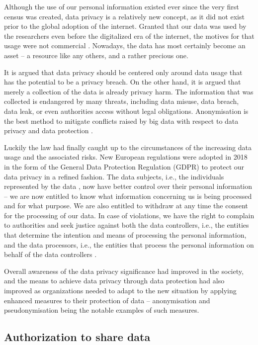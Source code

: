 \documentclass[a4paper,twoside,12pt]{book}
\begin{document}
Although the use of our personal information existed ever since the very first census was created, data privacy is a relatively new concept, as it did not exist prior to the global adoption of the internet. Granted that our data was used by the researchers even before the digitalized era of the internet, the motives for that usage were not commercial \cite{bib:gdpr_handbook}. Nowadays, the data has most certainly become an asset – a resource like any others, and a rather precious one.

It is argued that data privacy should be centered only around data usage that has the potential to be a privacy breach. On the other hand, it is argued that merely a collection of the data is already privacy harm. The information that was collected is endangered by many threats, including data misuse, data breach, data leak, or even authorities access without legal obligations. Anonymisation is the best method to mitigate conflicts raised by big data with respect to data privacy and data protection \cite{bib:big_data_privacy}.

Luckily the law had finally caught up to the circumstances of the increasing data usage and the associated risks. New European regulations were adopted in 2018 in the form of the General Data Protection Regulation (GDPR) to protect our data privacy in a refined fashion. The data subjects, i.e., the individuals represented by the data \cite{bib:anonymization_pipeline}, now have better control over their personal information – we are now entitled to know what information concerning us is being  processed and for what purpose. We are also entitled to withdraw at any time the consent for the processing of our data. In case of violations, we have the right to complain to authorities and seek justice against both the data controllers, i.e., the entities that determine the intention and means of processing the personal information, and the data processors, i.e., the entities that process the personal information on behalf of the data controllers \cite{bib:gdpr_compliance}.

Overall awareness of the data privacy significance had improved in the society, and the means to achieve data privacy through data protection had also improved as organizations needed to adapt to the new situation by applying enhanced measures to their protection of data – anonymisation and pseudonymisation being the notable examples of such measures. 

\subsection{Authorization to share data}
\end{document}
